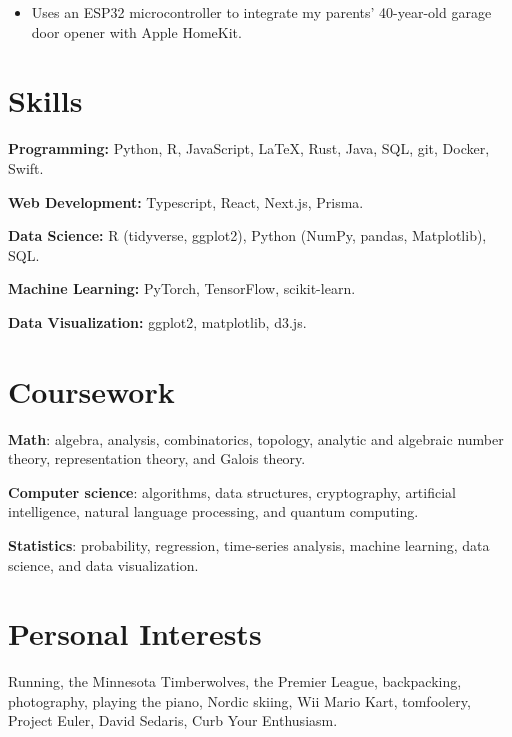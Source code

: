\documentclass{resume}
\begin{document}

\begin{itemize}
	\item Uses an ESP32 microcontroller to integrate my parents' 40-year-old garage door opener with Apple HomeKit.
\end{itemize}


\section{Skills}

\textbf{Programming:} Python, R, JavaScript, \LaTeX, Rust, Java, SQL, git, Docker, Swift.

\textbf{Web Development:} Typescript, React, Next.js, Prisma.

\textbf{Data Science:} R (tidyverse, ggplot2), Python (NumPy, pandas, Matplotlib), SQL.

\textbf{Machine Learning:} PyTorch, TensorFlow, scikit-learn.

\textbf{Data Visualization:} ggplot2, matplotlib, d3.js.

\section{Coursework}

\textbf{Math}:
algebra, analysis, combinatorics, topology, analytic and algebraic number theory, representation theory, and Galois theory.

\textbf{Computer science}:
algorithms, data structures, cryptography, artificial intelligence, natural language processing, and quantum computing.

\textbf{Statistics}:
probability, regression, time-series analysis, machine learning, data science, and data visualization.

\section{Personal Interests}

Running, the Minnesota Timberwolves, the Premier League, backpacking, photography, playing the piano, Nordic skiing, Wii Mario Kart, tomfoolery, Project Euler, David Sedaris, Curb Your Enthusiasm.
\end{document}
